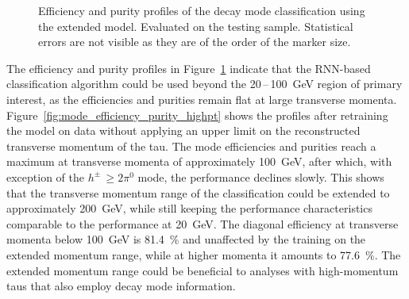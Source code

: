 \begin{figure}[htb]
\begin{subfigure}{0.48\textwidth}
  \end{subfigure}
  \caption[Efficiency and purity profiles of the extended model for decay mode
  classification]{Efficiency and purity profiles of the decay mode
    classification using the extended model. Evaluated on the testing sample.
    Statistical errors are not visible as they are of the order of the marker
    size.}
  \label{fig:mode_efficiency_purity}
\end{figure}

The efficiency and purity profiles in Figure~\ref{fig:mode_efficiency_purity}
indicate that the RNN-based classification algorithm could be used beyond the
20\,--\,\SI{100}{\GeV} region of primary interest, as the efficiencies and
purities remain flat at large transverse momenta.
Figure~\ref{fig:mode_efficiency_purity_highpt} shows the profiles after
retraining the model on data without applying an upper limit on the
reconstructed transverse momentum of the tau. The mode efficiencies and purities
reach a maximum at transverse momenta of approximately \SI{100}{\GeV}, after
which, with exception of the $h^\pm \, {\geq} 2 \pi^0$ mode, the performance
declines slowly.
This shows that the transverse momentum range of the classification could be
extended to approximately \SI{200}{\GeV}, while still keeping the performance
characteristics comparable to the performance at \SI{20}{\GeV}. The diagonal
efficiency at transverse momenta below \SI{100}{\GeV} is \SI{81.4}{\percent} and
unaffected by the training on the extended momentum range, while at higher
momenta it amounts to \SI{77.6}{\percent}. The extended momentum range could be
beneficial to analyses with high-momentum taus that also employ decay mode
information.

